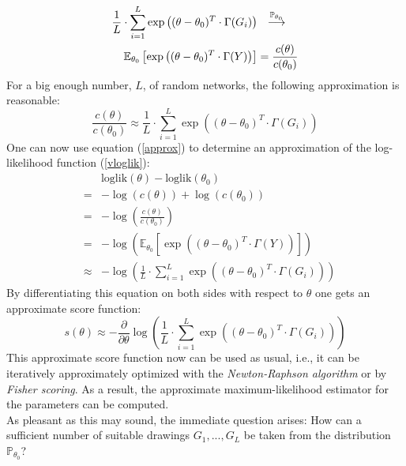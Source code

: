 \documentclass[10pt, conference, compsocconf]{IEEEtran}
\begin{document}
%
\begin{equation}\label{konver}
\begin{split}
\frac{1}{L}\cdot \sum_{i=1}^{L}  \exp\left((\theta - \theta_0)^T \cdot \Gamma(G_i)\right) &
~~\stackrel {{\tiny\mathbb{P}_{\theta_0}}}{\longrightarrow}~~\\ \mathbb{E}_{\theta_0}\left[ \exp\left((\theta - \theta_0)^T \cdot \Gamma(Y)\right) \right]& = \frac{c(\theta)}{c(\theta_0)}
\end{split}
\end{equation}
%
For a big enough number, $L$, of random networks, the following approximation is reasonable:
%
\begin{equation}
\frac{c(\theta)}{c(\theta_0)} \approx \frac{1}{L}\cdot \sum_{i=1}^{L}  \exp\left((\theta - \theta_0)^T \cdot \Gamma(G_i)\right)
\label{approx}
\end{equation}
%
One can now use equation (\ref{approx}) to determine an approximation of the log-likelihood function (\ref{vloglik}):
%
\begin{eqnarray*}
&&\text{loglik}(\theta)-\text{loglik}(\theta_0)\\&=&- \log(c(\theta))+\log(c(\theta_0))\\
                                             &=&- \log \left( \frac{c(\theta)}{c(\theta_0)} \right)\\
                                             &=&- \log \left( \mathbb{E}_{\theta_0}\left[ \exp\left((\theta - \theta_0)^T \cdot \Gamma(Y)\right) \right] \right)\\
                                             &\approx &- \log \left( \frac{1}{L} \cdot \sum_{i=1}^{L}  \exp \left((\theta - \theta_0)^T \cdot \Gamma(G_i) \right) \right)
\end{eqnarray*}
%
By differentiating this equation on both sides with respect to $\theta$ one gets an approximate score function:
%
\begin{equation}
s(\theta) \approx -\frac{\partial}{\partial \theta} \log \left( \frac{1}{L} \cdot \sum_{i=1}^{L}  \exp \left((\theta - \theta_0)^T \cdot \Gamma(G_i) \right) \right)
\label{score}
\end{equation}
%
This approximate score function now can be used as usual, i.e., it can be iteratively approximately optimized with the \textit{Newton-Raphson algorithm} or by \textit{Fisher scoring}. As a result, the approximate maximum-likelihood estimator for the parameters can be computed.\\[0.3cm]
As pleasant as this may sound, the immediate question arises: How can a sufficient number of suitable drawings $G_1,...,G_L$ be taken from the distribution $\mathbb{P}_{\theta_0}$? \\
\end{document}
